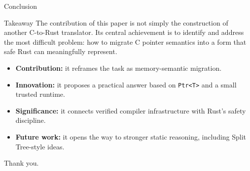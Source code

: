 \documentclass[aspectratio=169,11pt,professionalfonts]{beamer}
\newcommand{\ptr}{\texttt{Ptr<T>}}
\newcommand{\good}[1]{\textcolor{SJTUBlue}{#1}}
\begin{document}
\begin{frame}{Conclusion}
  \begin{block}{Takeaway}
    The contribution of this paper is not simply the construction of another C-to-Rust translator.
    Its central achievement is to identify and address the most difficult problem:
    \good{how to migrate C pointer semantics into a form that safe Rust can meaningfully represent}.
  \end{block}

  \vspace{0.7em}
  \begin{itemize}
    \item \textbf{Contribution:} it reframes the task as memory-semantic migration.
    \item \textbf{Innovation:} it proposes a practical answer based on \ptr{} and a small trusted runtime.
    \item \textbf{Significance:} it connects verified compiler infrastructure with Rust's safety discipline.
    \item \textbf{Future work:} it opens the way to stronger static reasoning, including Split Tree-style ideas.
  \end{itemize}

  \vspace{0.7em}
  \centering
  \Large Thank you.
\end{frame}




\end{document}
